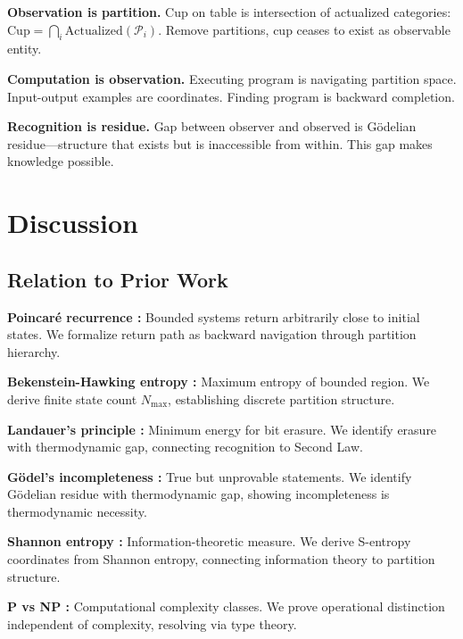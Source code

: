 \documentclass[twocolumn,10pt]{revtex4-2}
\theoremstyle{definition}
\theoremstyle{remark}
\newcommand{\Nmax}{N_{\max}}
\begin{document}
\textbf{Observation is partition.} Cup on table is intersection of actualized categories: $\text{Cup} = \bigcap_{i} \text{Actualized}(\mathcal{P}_i)$. Remove partitions, cup ceases to exist as observable entity.

\textbf{Computation is observation.} Executing program is navigating partition space. Input-output examples are coordinates. Finding program is backward completion.

\textbf{Recognition is residue.} Gap between observer and observed is Gödelian residue—structure that exists but is inaccessible from within. This gap makes knowledge possible.

\section{Discussion}
\label{sec:discussion}

\subsection{Relation to Prior Work}

\textbf{Poincaré recurrence \cite{Poincare1890}:} Bounded systems return arbitrarily close to initial states. We formalize return path as backward navigation through partition hierarchy.

\textbf{Bekenstein-Hawking entropy \cite{Bekenstein1973}:} Maximum entropy of bounded region. We derive finite state count $\Nmax$, establishing discrete partition structure.

\textbf{Landauer's principle \cite{Landauer1961}:} Minimum energy for bit erasure. We identify erasure with thermodynamic gap, connecting recognition to Second Law.

\textbf{Gödel's incompleteness \cite{Godel1931}:} True but unprovable statements. We identify Gödelian residue with thermodynamic gap, showing incompleteness is thermodynamic necessity.

\textbf{Shannon entropy \cite{Shannon1948}:} Information-theoretic measure. We derive S-entropy coordinates from Shannon entropy, connecting information theory to partition structure.

\textbf{P vs NP \cite{Cook1971}:} Computational complexity classes. We prove operational distinction independent of complexity, resolving via type theory.
\end{document}
